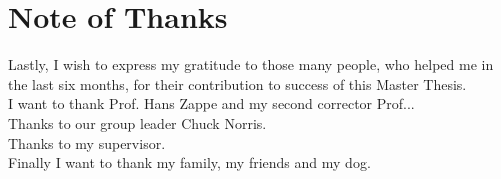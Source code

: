 \chapter*{Note of Thanks}     %
%
Lastly, I wish to express my gratitude to those many people, who helped me in the last six months, for their contribution to success of this Master Thesis. \\

I want to thank Prof. Hans Zappe and my second corrector Prof...\\

Thanks to our group leader Chuck Norris.\\

Thanks to my supervisor.\\

Finally I want to thank my family, my friends and my dog.
